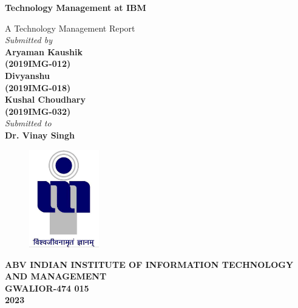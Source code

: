\title{}
\author{}
\thispagestyle{empty}

\begin{titlepage}
\begin{center}
{\LARGE \bf Technology Management at IBM} \\
\end{center}
\begin{center}
\vspace{0.6in}
{\LARGE A Technology Management Report} \\
\vspace{0.6in}
{\large \it Submitted by\\\vspace{0.1in}}
{\large \bf \vspace{0.2in}Aryaman Kaushik\\(2019IMG-012)\\}
{\large \bf \vspace{0.2in}Divyanshu\\(2019IMG-018)\\}
{\large \bf \vspace{0.2in}Kushal Choudhary\\(2019IMG-032)\\}
\vspace{0.6in}
{\large \it Submitted to\\}
\vspace{0.1in}
{\large \bf Dr. Vinay Singh}\\
\end {center}
\vspace{0.5in}
\begin{figure}[h]
\centerline{\includegraphics[width=1.2in]{./iiitm}}
\end{figure}
\begin{center}
{\Large \bf ABV INDIAN INSTITUTE OF INFORMATION TECHNOLOGY AND MANAGEMENT\\
GWALIOR-474 015\\}
\vspace{0.2in}
{\Large \bf 2023\\}
\end{center}
\end{titlepage}
